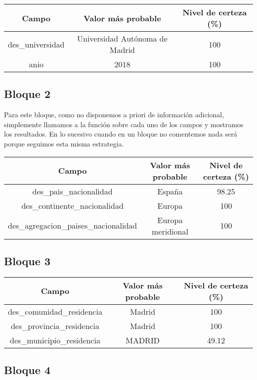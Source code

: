 \documentclass[11pt]{article}
\begin{document}
\begin{table}[h!]
  \centering
  \begin{tabular}{c|c|c}
    Campo & Valor más probable & Nivel de certeza (\%)\\
    \hline
    des\_universidad & Universidad Autónoma de Madrid & 100\\
    anio & 2018 & 100
  \end{tabular}
\end{table}

\subsection{Bloque 2}
Para este bloque, como no disponemos a priori de información adicional, simplemente llamamos a la función \verb@freq@ sobre cada uno de los campos y mostramos los resultados. En lo sucesivo cuando en un bloque no comentemos nada será porque seguimos esta misma estrategia.

\begin{table}[h!]
  \centering
  \begin{tabular}{c|c|c}
    Campo & Valor más probable & Nivel de certeza (\%)\\
    \hline
    des\_pais\_nacionalidad& España & 98.25\\
    des\_continente\_nacionalidad & Europa & 100\\
    des\_agregacion\_paises\_nacionalidad & Europa meridional & 100
  \end{tabular}
\end{table}

\subsection{Bloque 3}

\begin{table}[h!]
  \centering
  \begin{tabular}{c|c|c}
    Campo & Valor más probable & Nivel de certeza (\%)\\
    \hline
    des\_comunidad\_residencia& Madrid & 100\\
    des\_provincia\_residencia& Madrid & 100\\
    des\_municipio\_residencia& MADRID & 49.12\\
  \end{tabular}
\end{table}
\newpage

\subsection{Bloque 4}
\end{document}
